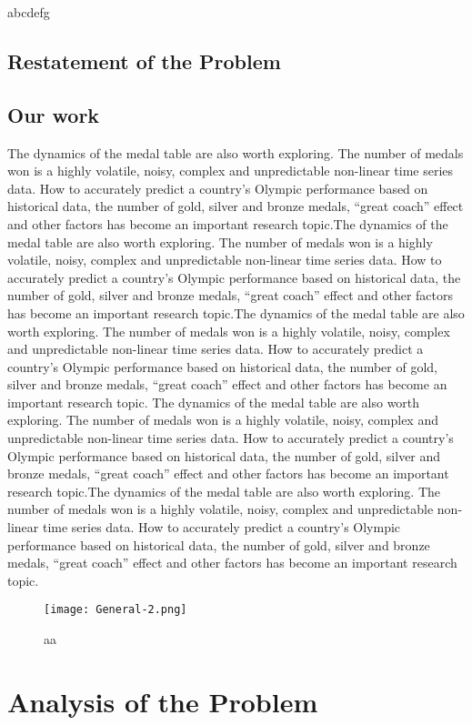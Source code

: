 \documentclass{mcmthesis}
\begin{document}
abcdefg

\subsection{Restatement of the Problem}
\subsection{Our work}
The dynamics of the medal table are also worth exploring. The number of medals won is a highly volatile, noisy, complex and unpredictable non-linear time series data. How to accurately predict a country's Olympic performance based on historical data, the number of gold, silver and bronze medals, “great coach” effect and other factors has become an important research topic.The dynamics of the medal table are also worth exploring. The number of medals won is a highly volatile, noisy, complex and unpredictable non-linear time series data. How to accurately predict a country's Olympic performance based on historical data, the number of gold, silver and bronze medals, “great coach” effect and other factors has become an important research topic.The dynamics of the medal table are also worth exploring. The number of medals won is a highly volatile, noisy, complex and unpredictable non-linear time series data. How to accurately predict a country's Olympic performance based on historical data, the number of gold, silver and bronze medals, “great coach” effect and other factors has become an important research topic.
The dynamics of the medal table are also worth exploring. The number of medals won is a highly volatile, noisy, complex and unpredictable non-linear time series data. How to accurately predict a country's Olympic performance based on historical data, the number of gold, silver and bronze medals, “great coach” effect and other factors has become an important research topic.The dynamics of the medal table are also worth exploring. The number of medals won is a highly volatile, noisy, complex and unpredictable non-linear time series data. How to accurately predict a country's Olympic performance based on historical data, the number of gold, silver and bronze medals, “great coach” effect and other factors has become an important research topic.
\begin{figure}[h]
  \small
  \centering
  \texttt{[image: General-2.png]}
  \caption{aa} \label{fig:aa}
  \end{figure}
  

\section{Analysis of the Problem}
\end{document}
